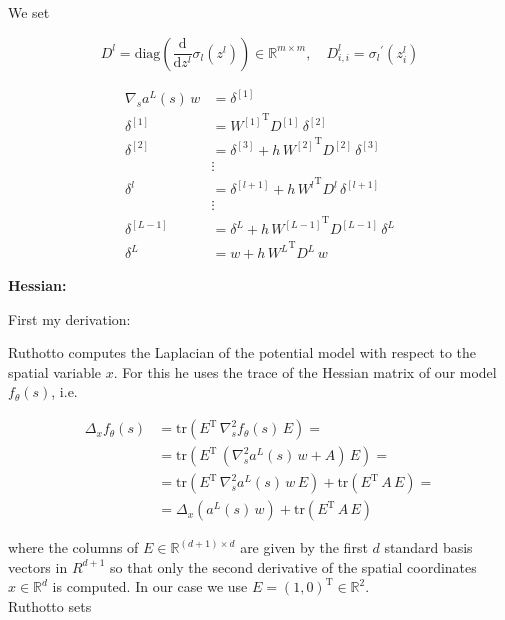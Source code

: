 We set

\begin{equation*}
    D^{l} = \mathrm{diag} \left( \frac{\mathrm{d}}{\mathrm{d}z^{l}} \sigma_{l} (z^{l}) \right) \in \mathbb{R}^{m \times m}, \quad D_{i, i}^{l} = {\sigma_{l}}^{\prime} (z_{i}^{l})
\end{equation*}

\begin{align*}
    \nabla_s a^{L}(s) \, w & = \delta^{[1]}  \\
    \delta^{[1]} & = {W^{[1]}}^{\mathrm{T}} D^{[1]} \, \delta^{[2]} \\
    \delta^{[2]} & = \delta^{[3]} + h \, {W^{[2]}}^{\mathrm{T}} D^{[2]} \, \delta^{[3]} \\
    &\vdots\\
    \delta^{l} & = \delta^{[l+1]} + h \, {W^{l}}^{\mathrm{T}} D^{l} \, \delta^{[l+1]} \\
    &\vdots\\
    \delta^{[L-1]} & = \delta^{L} + h \, {W^{[L-1]}}^{\mathrm{T}} D^{[L-1]} \, \delta^{L} \\
    \delta^{L} & = w + h \, {W^{L}}^{\mathrm{T}} D^{L} \, w
\end{align*}


\textbf{Hessian:}

First my derivation:

Ruthotto computes the Laplacian of the potential model with respect to the spatial variable $x$. For this he uses the trace of the Hessian matrix of our model $f_{\theta}(s)$, i.e. 

\begin{align*}
    \Delta_x f_{\theta}(s) & = \mathrm{tr}(E^{\mathrm{T}} \, \nabla^{2}_s f_{\theta}(s) \, E) = \\
    & = \mathrm{tr}(E^{\mathrm{T}} \, (\nabla^{2}_s a^{L}(s) \, w + A) \, E) = \\
    & = \mathrm{tr}(E^{\mathrm{T}} \, \nabla^{2}_s a^{L}(s) \, w \, E) + \mathrm{tr}(E^{\mathrm{T}} \,  A \, E) = \\
    & = \Delta_x (a^{L}(s) \, w) + \mathrm{tr}(E^{\mathrm{T}} \,  A \, E)
\end{align*}

where the columns of $E \in \mathbb{R}^{(d+1) \times d}$ are given by the first $d$ standard basis vectors in $R^{d+1}$ so that only the second derivative of the spatial coordinates $x \in \mathbb{R}^d$ is computed. In our case we use $E = (1, 0)^{\mathrm{T}} \in \mathbb{R}^{2}$. \\
Ruthotto sets

